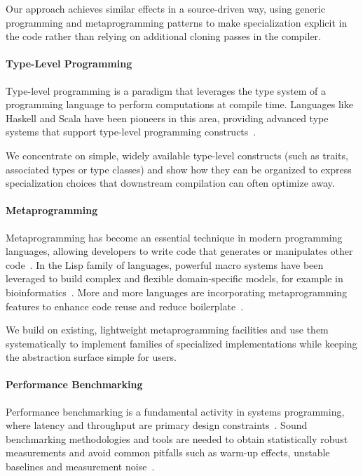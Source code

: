 Our approach achieves similar effects in a source-driven way, using generic programming and metaprogramming patterns to make specialization explicit in the code rather than relying on additional cloning passes in the compiler.

\paragraph{Type-Level Programming}
Type-level programming is a paradigm that leverages the type system of a programming language to perform computations at compile time.
Languages like Haskell and Scala have been pioneers in this area, providing advanced type systems that support type-level programming constructs~\cite{TypeLevelProgrammingHaskell19, TypeLevelProgrammingMatchTypes22}.

We concentrate on simple, widely available type-level constructs (such as traits, associated types or type classes) and show how they can be organized to express specialization choices that downstream compilation can often optimize away.

\paragraph{Metaprogramming}
Metaprogramming has become an essential technique in modern programming languages, allowing developers to write code that generates or manipulates other code~\cite{Clinger1991MacrosTW}.
In the Lisp family of languages, powerful macro systems have been leveraged to build complex and flexible domain-specific models, for example in bioinformatics~\cite{Khomtchouk2016TheMT}.
More and more languages are incorporating metaprogramming features to enhance code reuse and reduce boilerplate~\cite{HaskellMetaProgramming02, ScalaMacros13}.

We build on existing, lightweight metaprogramming facilities and use them systematically to implement families of specialized implementations while keeping the abstraction surface simple for users.

\paragraph{Performance Benchmarking}
Performance benchmarking is a fundamental activity in systems programming, where latency and throughput are primary design constraints~\cite{kounev2020systems}.
Sound benchmarking methodologies and tools are needed to obtain statistically robust measurements and avoid common pitfalls such as warm-up effects, unstable baselines and measurement noise~\cite{BenchmarkingPitfalls19}.


